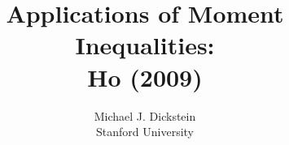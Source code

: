 %
%
%
%


\def\beamerclassoptions{[notes=show]}

\usepackage{mathpazo}
\usepackage{hyperref}


\usepackage{graphicx}
\usepackage[latin1]{inputenc}
\usepackage{listings}
\usepackage{amsmath}
\usepackage{amsfonts}
\usepackage{amsxtra}
\usepackage{amstext}
\usepackage{amssymb}
\usepackage{latexsym}
\usepackage{subfigure}
\usepackage{eurosym}
\linespread{1.2}
\usepackage{multimedia}
\usepackage{dsfont} %
\usepackage{graphicx}
\usepackage{color,colortbl}
\usepackage{multirow}
\usepackage{bbm}


\newenvironment{stepenumerate}{\begin{enumerate}[<+->]}{\end{enumerate}}
\newenvironment{stepitemize}{\begin{itemize}[<+->]}{\end{itemize} }
\newenvironment{stepenumeratewithalert}{\begin{enumerate}[<+-| alert@+>]}{\end{enumerate}}
\newenvironment{stepitemizewithalert}{\begin{itemize}[<+-| alert@+>]}{\end{itemize} }

%



\title[Moment Inequalities]{Applications of Moment Inequalities:\\ Ho (2009) }
\author[MJ Dickstein]{Michael J. Dickstein \\
Stanford University}
\maketitle

